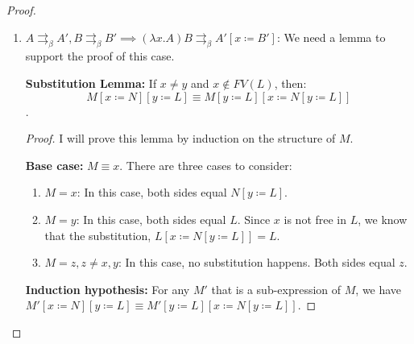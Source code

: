 \documentclass[a4paper,11pt]{article}
\theoremstyle{definition}
\theoremstyle{example}
\theoremstyle{lemma}
\newcommand{\lamterm}[2]{\lambda #1. #2}
\newcommand{\subs}[3]{#1[#2\coloneqq#3]}
\newcommand{\pbr}{\rightrightarrows_{\beta}}
\begin{document}
\begin{proof}
\begin{enumerate}[topsep=2pt,itemsep=-0.5ex,partopsep=1ex,parsep=1ex]
     \item $A \pbr A', B \pbr B' \implies (\lamterm{x}{A})B \pbr \subs{A'}{x}{B'}$: We need a lemma to support the proof of this case.
     
     \textbf{Substitution Lemma: }If $x \neq y$ and $x \notin FV(L)$, then:
     $$\subs{\subs{M}{x}{N}}{y}{L} \equiv \subs{\subs{M}{y}{L}}{x}{\subs{N}{y}{L}}$$.
     \begin{proof}
     I will prove this lemma by induction on the structure of $M$.
     
     \textbf{Base case: }$M \equiv x$. There are three cases to consider:
     \vspace{-3mm}
     \begin{enumerate}[noitemsep]
         \item $M=x$: In this case, both sides equal $\subs{N}{y}{L}$.
         \item $M=y$: In this case, both sides equal $L$. Since $x$ is not free in $L$, we know that the substitution, $\subs{L}{x}{\subs{N}{y}{L}} = L$.
         \item $M=z, z \neq x, y$: In this case, no substitution happens. Both sides equal $z$.
     \end{enumerate}
     
     \textbf{Induction hypothesis: }For any $M'$ that is a sub-expression of $M$, we have $\subs{\subs{M'}{x}{N}}{y}{L} \equiv \subs{\subs{M'}{y}{L}}{x}{\subs{N}{y}{L}}$.
     

\end{proof}
\end{enumerate}
\end{proof}
\end{document}
